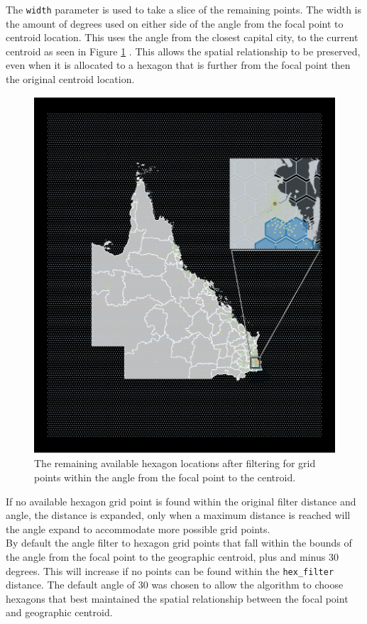 The \texttt{width} parameter is used to take a slice of the remaining
points. The width is the amount of degrees used on either side of the
angle from the focal point to centroid location. This uses the angle
from the closest capital city, to the current centroid as seen in Figure
\ref{fig:angles} . This allows the spatial relationship to be preserved,
even when it is allocated to a hexagon that is further from the focal
point then the original centroid location.

\begin{figure}[h]
\centering
\includegraphics[width=16cm]{figs/5allocate.pdf}
\caption{\label{fig:angles}The remaining available hexagon locations after filtering for grid points within the angle from the focal point to the centroid.}
\end{figure}

If no available hexagon grid point is found within the original filter
distance and angle, the distance is expanded, only when a maximum
distance is reached will the angle expand to accommodate more possible
grid points.\\
By default the angle filter to hexagon grid points that fall within the
bounds of the angle from the focal point to the geographic centroid,
plus and minus 30 degrees. This will increase if no points can be found
within the \texttt{hex\_filter} distance. The default angle of 30 was
chosen to allow the algorithm to choose hexagons that best maintained
the spatial relationship between the focal point and geographic
centroid.

